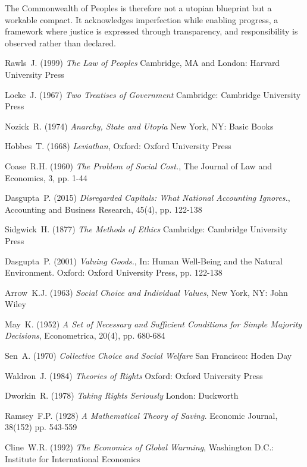 \documentclass[12pt, oneside]{article}   	%
\begin{document}
The Commonwealth of Peoples is therefore not a utopian blueprint but a workable compact.
It acknowledges imperfection while enabling progress, a framework where justice is expressed through transparency, and responsibility is observed rather than declared.\\

\begin{thebibliography}{99}

 Rawls~J. (1999)
\emph{The Law of Peoples}
Cambridge, MA and London: Harvard University Press

 Locke~J. (1967)
\emph{Two Treatises of Government}
Cambridge: Cambridge University Press
	
 Nozick~R. (1974)
\emph{Anarchy, State and Utopia}
New York, NY: Basic Books
	
 Hobbes~T. (1668)
\emph{Leviathan},
Oxford: Oxford University Press

 Coase~R.H. (1960)
\emph{The Problem of Social Cost.},
The Journal of Law and Economics, 3, pp. 1-44

 Dasgupta~P. (2015)
\emph{Disregarded Capitals: What National Accounting Ignores.},
Accounting and Business Research, 45(4), pp. 122-138

 Sidgwick~H. (1877)
\emph{The Methods of Ethics}
Cambridge: Cambridge University Press

 Dasgupta~P. (2001)
\emph{Valuing Goods.},
In: Human Well-Being and the Natural Environment. Oxford: Oxford University Press, pp. 122-138

 Arrow~K.J. (1963)
\emph{Social Choice and Individual Values},
New York, NY: John Wiley
	
 May~K. (1952)
\emph{A Set of Necessary and Sufficient Conditions for Simple Majority Decisions},
Econometrica, 20(4), pp. 680-684

 Sen~A. (1970)
\emph{Collective Choice and Social Welfare}
San Francisco: Hoden Day

 Waldron~J. (1984)
\emph{Theories of Rights}
Oxford: Oxford University Press
		
 Dworkin~R. (1978)
\emph{Taking Rights Seriously}
London: Duckworth

 Ramsey~F.P. (1928)
\emph{A Mathematical Theory of Saving.}
Economic Journal, 38(152) pp. 543-559

 Cline~W.R. (1992)
\emph{The Economics of Global Warming},
Washington D.C.: Institute for International Economics
		

\end{thebibliography}
\end{document}
